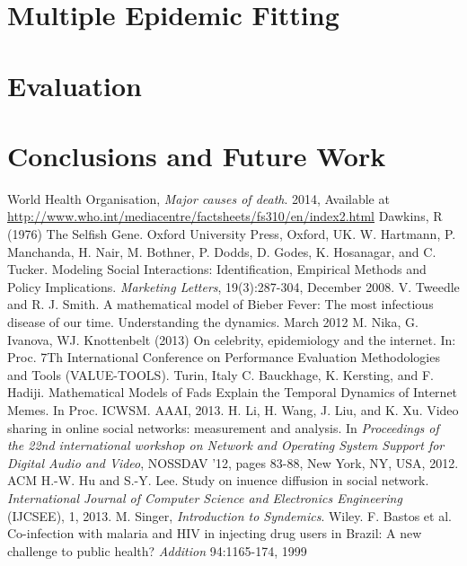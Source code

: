 \documentclass[11pt, a4paper, oneside,titlepage]{article}
\begin{document}
\newpage
\section{Multiple Epidemic Fitting}


\newpage
\section{Evaluation}


\newpage
\section{Conclusions and Future Work}

\begin{thebibliography}{1}
		World Health Organisation,
		\emph{Major causes of death}.
		2014,
		Available at \url{http://www.who.int/mediacentre/factsheets/fs310/en/index2.html}
		Dawkins, R (1976) The Selfish Gene. Oxford University Press, Oxford, UK.
		W. Hartmann, P. Manchanda, H. Nair, M. Bothner, P. Dodds, D. Godes, K. Hosanagar, and C. Tucker. Modeling Social Interactions: Identification, Empirical Methods and Policy Implications. \emph{Marketing Letters}, 19(3):287-304, December 2008.
		V. Tweedle and R. J. Smith. A mathematical model of Bieber Fever: The most infectious disease of our time. Understanding the dynamics. March 2012
		M. Nika, G. Ivanova, WJ. Knottenbelt (2013) On celebrity, epidemiology and the internet. In: Proc. 7Th International Conference on Performance Evaluation Methodologies and Tools (VALUE-TOOLS). Turin, Italy
		C. Bauckhage, K. Kersting, and F. Hadiji. Mathematical Models of Fads Explain the Temporal Dynamics of Internet Memes. In Proc. ICWSM. AAAI, 2013.
	H. Li, H. Wang, J. Liu, and K. Xu. Video sharing in online social networks: measurement and analysis. In \emph{Proceedings of the 22nd international workshop on Network and Operating System Support for Digital Audio and Video}, NOSSDAV '12, pages 83-88, New York, NY, USA, 2012. ACM
		H.-W. Hu and S.-Y. Lee. Study on inuence diffusion in social network. \emph{International Journal of Computer Science and Electronics Engineering} (IJCSEE), 1, 2013.
		M. Singer, \emph{Introduction to Syndemics}. Wiley.
		F. Bastos et al. Co-infection with malaria and HIV in injecting drug users in Brazil: A new challenge to public health? \emph{Addition} 94:1165-174, 1999

\end{thebibliography}
\end{document}
